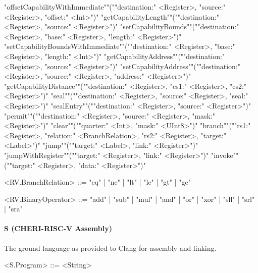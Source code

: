 \documentclass[main.tex]{subfiles}
\begin{document}
\begin{grammar}
						\alt "offsetCapabilityWithImmediate""(""destination:" <Register>, "source:" <Register>, "offset:" <Int>")"
						\alt "getCapabilityLength""(""destination:" <Register>, "source:" <Register>")"
						\alt "setCapabilityBounds""(""destination:" <Register>, "base:" <Register>, "length:" <Register>")"
						\alt "setCapabilityBoundsWithImmediate""(""destination:" <Register>, "base:" <Register>, "length:" <Int>")"
						\alt "getCapabilityAddress""(""destination:" <Register>, "source:" <Register>")"
						\alt "setCapabilityAddress""(""destination:" <Register>, "source:" <Register>, "address:" <Register>")"
						\alt "getCapabilityDistance""(""destination:" <Register>, "cs1:" <Register>, "cs2:" <Register>")"
						\alt "seal""(""destination:" <Register>, "source:" <Register>, "seal:" <Register>")"
						\alt "sealEntry""(""destination:" <Register>, "source:" <Register>")"
						\alt "permit""(""destination:" <Register>, "source:" <Register>, "mask:" <Register>")"
						\alt "clear""(""quarter:" <Int>, "mask:" <UInt8>")"
						\alt "branch""(""rs1:" <Register>, "relation:" <BranchRelation>, "rs2:" <Register>, "target:" <Label>")"
						\alt "jump""(""target:" <Label>, "link:" <Register>")"
						\alt "jumpWithRegister""(""target:" <Register>, "link:" <Register>")"
						\alt "invoke""(""target:" <Register>, "data:" <Register>")"
				\par
				<RV.BranchRelation> ::=
						"eq"
						| "ne"
						| "lt"
						| "le"
						| "gt"
						| "ge"
				\par
				<RV.BinaryOperator> ::=
						"add"
						| "sub"
						| "mul"
						| "and"
						| "or"
						| "xor"
						| "sll"
						| "srl"
						| "sra"
				\par
\end{grammar}
\par
\paragraph{ S (CHERI-RISC-V Assembly) } The ground language as provided to Clang for assembly and linking.
\begin{grammar}
	\footnotesize
				<S.Program> ::=
						<String>
				\par
\end{grammar}
\par

\biblio{}
\onlyinsubfile{\glsaddall\printglossaries}
\end{document}
